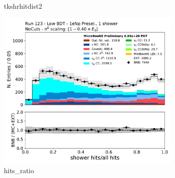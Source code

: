 \begin{figure}[H]
\begin{subfigure}{0.3\textwidth}
    \caption{tkshrhitdist2}
    \end{subfigure}
    \begin{subfigure}{0.3\textwidth}
    \includegraphics[width=1.0\textwidth]{Sidebands/Figures/1eNp/LPID_NPOneShr_None_pi0e40/hits_ratio.pdf}
    \caption{hits\_ratio}
    \end{subfigure}
    \caption{} 
    \label{fig:LPID_1eNp_3}
\end{figure}

